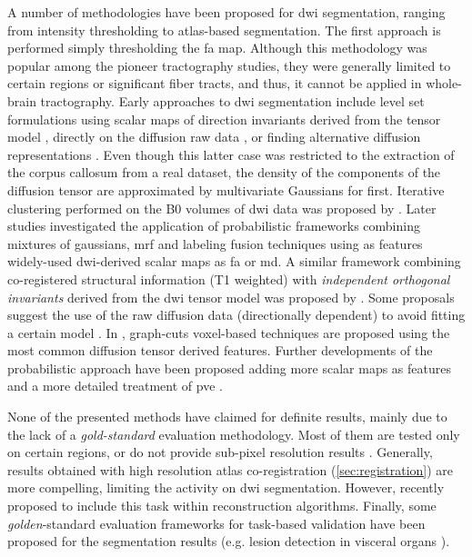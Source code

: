A number of methodologies have been proposed for \gls{dwi} segmentation, ranging 
from intensity thresholding to atlas-based segmentation. 
The first approach is performed simply thresholding the \gls{fa} map.
Although this methodology was popular among the pioneer tractography studies,
they were generally limited to certain regions or significant fiber tracts, and thus,
it cannot be applied in whole-brain tractography. Early approaches to \gls{dwi} segmentation 
include level set formulations using scalar maps of direction invariants derived
from the tensor model \citep{zhukov_level_2003}, directly on the diffusion raw data
\citep{rousson_level_2004}, or finding alternative diffusion representations 
\citep{jonasson_representing_2007}. Even though this latter case was restricted to the extraction of
the corpus callosum from a real dataset, the density of the components of the diffusion tensor
are approximated by multivariate Gaussians for first. Iterative clustering performed on the 
B0 volumes of \gls{dwi} data was proposed by \citep{hadjiprocopis_unbiased_2005}.
Later studies investigated the application of probabilistic frameworks combining mixtures of 
gaussians, \gls{mrf} and labeling fusion techniques \citep{liu_brain_2007} using as features 
widely-used \gls{dwi}-derived scalar maps as \gls{fa} or \gls{md}. A similar framework 
combining co-registered structural information (T1 weighted) with \emph{independent orthogonal 
invariants} derived from the \gls{dwi} tensor model was proposed by \citep{awate_multivariate_2008}. 
Some proposals suggest the use of the raw diffusion data (directionally dependent) to avoid fitting 
a certain model \citep{lu_segmentation_2008}. In \citep{han_experimental_2009}, graph-cuts 
voxel-based techniques are proposed using the most common diffusion tensor derived features.
Further developments of the probabilistic approach have been proposed adding more scalar maps
as features and a more detailed treatment of \gls{pve} \citep{kumazawa_partial_2010}.


None of the presented methods have claimed for definite results, mainly due to the lack of 
a \emph{gold-standard} evaluation methodology. Most of them are tested only on certain
regions, or do not provide sub-pixel resolution results
\citep{hadjiprocopis_unbiased_2005,liu_brain_2007,awate_multivariate_2008,lu_segmentation_2008,
han_experimental_2009}. Generally, results obtained with high resolution atlas co-registration
(\autoref{sec:registration}) are more compelling, limiting the activity on \gls{dwi} 
segmentation. However, recently \citep{kumazawa_improvement_2013} proposed to include this
task within reconstruction algorithms. Finally, some \emph{golden}-standard evaluation
frameworks for task-based validation have been proposed for the segmentation results
(e.g. lesion detection in visceral organs \citep{jha_task-based_2012}).


